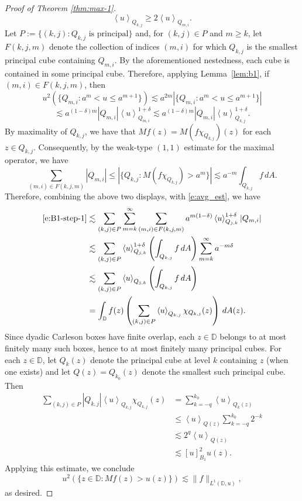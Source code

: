 \documentclass[10pt,a4paper]{amsart}
\newcommand{\avg}[1]{\left\langle {#1}\right\rangle}
\begin{document}
\begin{proof}[Proof of Theorem \ref{thm:max-1}]
    \[
        \avg{u}_{Q_{k,j}} \ge 2 \avg{u}_{Q_{m,i}}.
    \]
    Let $P := \{(k,j) \colon Q_{k,j} \text{ is principal}\}$ and, for $(k,j) \in P$ and $m \ge k$, let $F(k,j,m)$ denote the collection of indices $(m,i)$ for which $Q_{k,j}$ is the smallest principal cube containing $Q_{m,i}$. By the aforementioned nestedness, each cube is contained in some principal cube. Therefore, applying Lemma~\ref{lem:b1}, if $(m,i) \in F(k,j,m)$, then
    \[ u^2(\{Q_{m,i} \colon a^m < u \le a^{m+1}\})\lesssim a^{2m}|\{Q_{m,i} \colon a^m < u \le a^{m+1}\}| \] 
    \[ \lesssim a^{(1-\delta)m}|Q_{m,i}|\avg{u}_{Q_{m,i}}^{1+\delta} \lesssim a^{(1-\delta)m}|Q_{m,i}|\avg{u}_{Q_{k,j}}^{1+\delta} .
    \]
    By maximality of $Q_{k,j}$, we have that $Mf(z) = M(f\chi_{Q_{k,j}})(z)$ for each $z \in Q_{k,j}$. Consequently, by the weak-type $(1,1)$ estimate for the maximal operator, we have 
    \[
        \sum_{(m,i) \in F(k,j,m)}|Q_{m,i}| \le |\{ Q_{k,j} \colon M(f\chi_{Q_{k,j}}) > a^m \}| \lesssim a^{-m}\int_{Q_{k,j}}f\,dA.
    \]
   Therefore, combining the above two displays,
    with \eqref{e:avg_est}, we have
    \begin{align*}
        \eqref{e:B1-step-1}
        &\lesssim \sum_{(k,j) \in P}\sum_{m=k}^\infty \sum_{(m,i) \in F(k,j,m)} a^{m(1-\delta)}\avg{u}_{Q_{j,k}}^{1 + \delta}|Q_{m,i}| \\
        &\lesssim \sum_{(k,j) \in P} \avg{u}_{Q_{j,k}}^{1 + \delta}\left(\int_{Q_{k,j}}f\,dA\right)\sum_{m=k}^\infty a^{-m\delta}\\
        &\lesssim \sum_{(k,j) \in P} \avg{u}_{Q_{j,k}} \left(\int_{Q_{k,j}}f\,dA\right)\\   
        &= \int_{\mathbb{D}}f(z)\left(\sum_{(k,j) \in P}\avg{u}_{Q_{k,j}}\chi_{Q_{k,j}}(z)\right)\,dA(z).
    \end{align*}
    Since dyadic Carleson boxes have finite overlap, each $z \in \mathbb{D}$ belongs to at most finitely many such boxes, hence to at most finitely many principal cubes. For each $z \in \mathbb{D}$, let $Q_k(z)$ denote the principal cube at level $k$ containing $z$ (when one exists) and let $Q(z) = Q_{k_0}(z)$ denote the smallest such principal cube. Then
    \begin{align*}
        \sum_{(k,j) \in P}{|Q_{k,j}|}\avg{u}_{Q_{k,j}}\chi_{Q_{k,j}}(z) 
        &= \sum_{k = -q}^{k_0}\avg{u}_{Q_k(z)}\\
        &\le \avg{u}_{Q(z)}\sum_{k = -q}^{k_0}2^{-k}\\
        &\lesssim 2^q\avg{u}_{Q(z)} \\
        &\lesssim [u]_{B_1}^2u(z).
    \end{align*}
    Applying this estimate, we conclude
    \[
        u^2(\{z \in \mathbb{D} \colon Mf(z) > u(z) \}) \lesssim \|f\|_{L^1(\mathbb{D},u)},
    \]
    as desired.
\end{proof}
\end{document}
